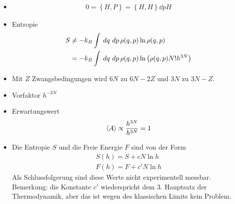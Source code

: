 \begin{itemize}
  \item %
    \begin{align*}
      0 = \left\{ H,P \right\} = \left\{ H, H \right\} \dd{p}{H}
    \end{align*}
  \item Entropie 
    \begin{align*}
      S & \neq - k_B \int_{}^{} \,dq\, \,dp\, \rho(q,p) \ln{\rho(q,p)} \\
        & = -k_B \int_{}^{} \,dq\, \,dp\, \rho(q,p) \ln{\left( 
  \rho(q,p) N! h^{3N}\right)}
    \end{align*}
  \item Mit $Z$ Zwangsbedingungen wird $6N$ zu $6N - 2Z$ und $3N$ zu $3N - Z$.
  \item Vorfaktor $h^{-3N}$
  \item Erwartungswert 
    \begin{align*}
      \Braket{A} \propto \frac{h^{3N}}{h^{3N}} = 1
    \end{align*}
  \item Die Entropie $S$ und die Freie Energie $F$ sind von der Form
    \begin{align*}
      S(h) = S + c N \ln{h} \\
      F(h) = F + c' N \ln{h}
    \end{align*}
    Als Schlussfolgerung sind diese Werte nicht experimentell messbar.
    Bemerkung: die Konstante $c'$ wiederspricht dem 3. Hauptsatz der
    Thermodynamik, aber das ist wegen des klassischen Limits kein Problem.
\end{itemize}

